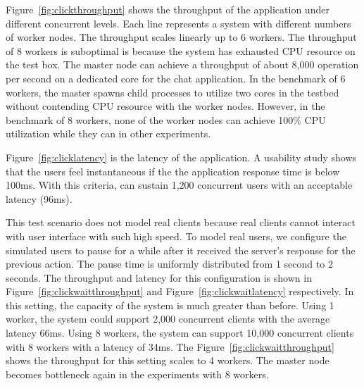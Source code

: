 Figure~\ref{fig:clickthroughput} shows the throughput of the application 
under different concurrent levels.
Each line represents a \cb{} system with different numbers of worker nodes.
The throughput scales linearly up to 6 workers.
The throughput of 8 workers is suboptimal is because
the system has exhausted CPU resource on the test box.
The master node can achieve a throughput of about 8,000 operation per second on a dedicated core for the
chat application.
In the benchmark of 6 workers, the master spawns child processes to utilize two cores in the testbed 
without contending CPU resource with the worker nodes.
However, in the benchmark of 8 workers, none of the worker nodes can achieve 100\% CPU
utilization while they can in other experiments.

\clicklatency{}

Figure~\ref{fig:clicklatency} is the latency of the application.
A usability study shows that the users feel instantaneous if the 
the application response time is below 100ms.
With this criteria,
\cb{} can sustain 1,200 concurrent users with an acceptable latency (96ms).


This test scenario does not model real clients because real clients cannot 
interact with user interface with such high speed.
To model real users, we configure the simulated users to pause for a while
after it received the server's response for the previous action.
The pause time is uniformly distributed from 1 second to 2 seconds.
The throughput and latency for this configuration is shown 
in Figure~\ref{fig:clickwaitthroughput} and Figure~\ref{fig:clickwaitlatency} respectively.
In this setting, the capacity of the system is much greater than before.
Using 1 worker, the system could support 2,000 concurrent clients with the average latency 66ms.
Using 8 workers, 
the system can support 10,000 concurrent clients with 8 workers with a latency of 34ms.
The Figure~\ref{fig:clickwaitthroughput} shows the throughput for this setting 
scales to 4 workers.
The master node becomes bottleneck again in the experiments with 8 workers.


\clickwaitthroughput{}
\clickwaitlatency{}

